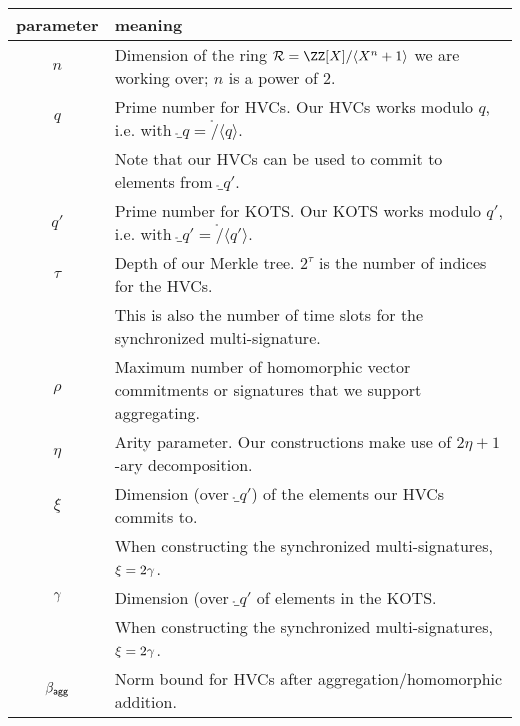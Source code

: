 \begin{table}
\centering
\begin{tabular}{c@{\hskip 2ex}l}
 parameter & meaning\\\toprule
 $n$ & Dimension of the ring $\ring = \defring$ we are working over; $n$ is a power of 2.\\
 $q$ & Prime number for HVCs. Our HVCs works modulo $q$, i.e. with $\ring_q = \ring/\langle q\rangle$.\\
     & Note that our HVCs can be used to commit to elements from $\ring_{q'}$.\\
 $q'$ & Prime number for KOTS. Our KOTS works modulo $q'$, i.e. with $\ring_{q'} = \ring/\langle q'\rangle$.\\
 $\tau$ & Depth of our Merkle tree. $2^\tau$ is the number of indices for the HVCs.\\
 & This is also the number of time slots for the synchronized multi-signature.\\
 $\rho$ & Maximum number of homomorphic vector commitments or signatures that we support aggregating.\\
 $\eta$ & Arity parameter. Our constructions make use of $2\eta+1$-ary decomposition.\\
 $\xi$ & Dimension (over $\ring_{q'}$) of the elements our HVCs commits to.\\
       & When constructing the synchronized multi-signatures, $\xi = 2\gamma$.\\
 $\gamma$ & Dimension (over $\ring_{q'}$ of elements in the KOTS.\\
                & When constructing the synchronized multi-signatures, $\xi = 2\gamma$.\\
 $\beta_{\mathsf{agg}}$ & Norm bound for HVCs after aggregation/homomorphic addition.\\

\end{tabular}
\end{table}

